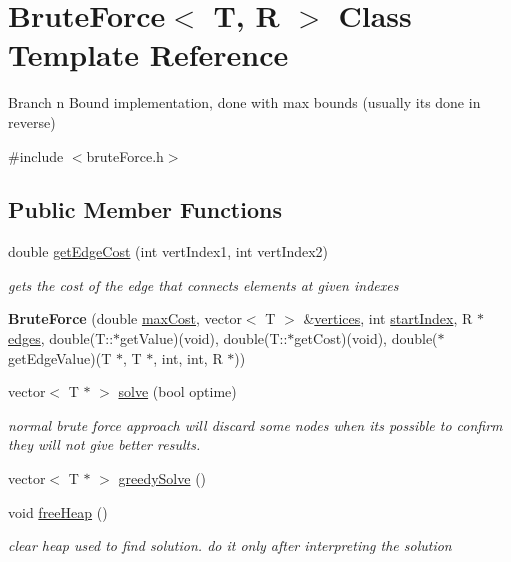 \hypertarget{class_brute_force}{}\section{Brute\+Force$<$ T, R $>$ Class Template Reference}
\label{class_brute_force}


Branch n Bound implementation, done with max bounds (usually it\textquotesingle{}s done in reverse)  




{\ttfamily \#include $<$brute\+Force.\+h$>$}

\subsection*{Public Member Functions}
\begin{DoxyCompactItemize}
\item 
double \hyperlink{class_brute_force_adb9075a2004631bb5c9b84be4d9db703}{get\+Edge\+Cost} (int vert\+Index1, int vert\+Index2)
\begin{DoxyCompactList}\small\item\em gets the cost of the edge that connects elements at given indexes \end{DoxyCompactList}\item 
\hypertarget{class_brute_force_aea1cc0269b2721549509a568d4c10673}{}{\bfseries Brute\+Force} (double \hyperlink{class_brute_force_ae66347aacfd3475ef265f17b0df1df4d}{max\+Cost}, vector$<$ T $>$ \&\hyperlink{class_brute_force_a0396c2f7b943c2894ce9fe8c11737030}{vertices}, int \hyperlink{class_brute_force_a11c645961c0bf974d5da32dfbc0c07e0}{start\+Index}, R $\ast$\hyperlink{class_brute_force_a183a96de9d3c8541e387bea53cffa8ed}{edges}, double(T\+::$\ast$get\+Value)(void), double(T\+::$\ast$get\+Cost)(void), double($\ast$get\+Edge\+Value)(T $\ast$, T $\ast$, int, int, R $\ast$))\label{class_brute_force_aea1cc0269b2721549509a568d4c10673}

\item 
vector$<$ T $\ast$ $>$ \hyperlink{class_brute_force_a9403e140036ec12e8ab3380ce78b5dd6}{solve} (bool optime)
\begin{DoxyCompactList}\small\item\em normal brute force approach will discard some nodes when it\textquotesingle{}s possible to confirm they will not give better results. \end{DoxyCompactList}\item 
vector$<$ T $\ast$ $>$ \hyperlink{class_brute_force_a070b976f2956db17cfff5ff534decd8e}{greedy\+Solve} ()
\item 
\hypertarget{class_brute_force_ac6f8a22139f24e8869d7dcf153522b23}{}void \hyperlink{class_brute_force_ac6f8a22139f24e8869d7dcf153522b23}{free\+Heap} ()\label{class_brute_force_ac6f8a22139f24e8869d7dcf153522b23}

\begin{DoxyCompactList}\small\item\em clear heap used to find solution. do it only after interpreting the solution \end{DoxyCompactList}\end{DoxyCompactItemize}
